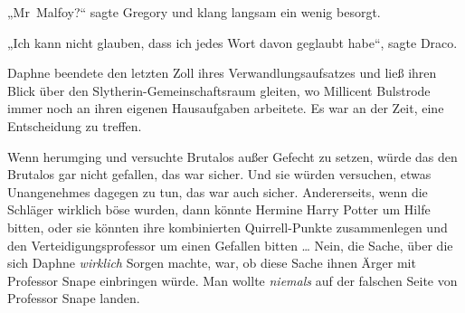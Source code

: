 „Mr~Malfoy?“ sagte Gregory und klang langsam ein wenig besorgt.

„Ich kann nicht glauben, dass ich jedes Wort davon geglaubt habe“, sagte Draco.

\later

Daphne beendete den letzten Zoll ihres Verwandlungsaufsatzes und ließ ihren Blick über den Slytherin-Gemeinschaftsraum gleiten, wo Millicent Bulstrode immer noch an ihren eigenen Hausaufgaben arbeitete. Es war an der Zeit, eine Entscheidung zu treffen.

Wenn \SPHEW herumging und versuchte Brutalos außer Gefecht zu setzen, würde das den Brutalos gar nicht gefallen, das war sicher. Und sie würden versuchen, etwas Unangenehmes dagegen zu tun, das war auch sicher. Andererseits, wenn die Schläger wirklich böse wurden, dann könnte Hermine Harry Potter um Hilfe bitten, oder sie könnten ihre kombinierten Quirrell-Punkte zusammenlegen und den Verteidigungsprofessor um einen Gefallen bitten … Nein, die Sache, über die sich Daphne \emph{wirklich} Sorgen machte, war, ob diese Sache ihnen Ärger mit Professor Snape einbringen würde. Man wollte \emph{niemals} auf der falschen Seite von Professor Snape landen.

